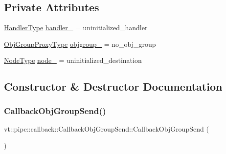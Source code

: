 \subsection*{Private Attributes}
\begin{DoxyCompactItemize}
\item 
\hyperlink{namespacevt_af64846b57dfcaf104da3ef6967917573}{Handler\+Type} \hyperlink{structvt_1_1pipe_1_1callback_1_1_callback_obj_group_send_a7094a47cb936ccb444824384f5f2d57d}{handler\+\_\+} = uninitialized\+\_\+handler
\item 
\hyperlink{namespacevt_ad7cae989df485fccca57f0792a880a8e}{Obj\+Group\+Proxy\+Type} \hyperlink{structvt_1_1pipe_1_1callback_1_1_callback_obj_group_send_a975adbdb55edfb825eeb61602a06c562}{objgroup\+\_\+} = no\+\_\+obj\+\_\+group
\item 
\hyperlink{namespacevt_a866da9d0efc19c0a1ce79e9e492f47e2}{Node\+Type} \hyperlink{structvt_1_1pipe_1_1callback_1_1_callback_obj_group_send_af35c63aed6fa74b41ff75d54216bdc0c}{node\+\_\+} = uninitialized\+\_\+destination
\end{DoxyCompactItemize}


\subsection{Constructor \& Destructor Documentation}
\mbox{\label{structvt_1_1pipe_1_1callback_1_1_callback_obj_group_send_ad23abb2b17572d769a347984efe6441b}} 
\subsubsection{\texorpdfstring{Callback\+Obj\+Group\+Send()}{CallbackObjGroupSend()}\hspace{0.1cm}{\footnotesize\ttfamily [1/2]}}
{\footnotesize\ttfamily vt\+::pipe\+::callback\+::\+Callback\+Obj\+Group\+Send\+::\+Callback\+Obj\+Group\+Send (\begin{DoxyParamCaption}{ }\end{DoxyParamCaption})\hspace{0.3cm}{\ttfamily [default]}}

